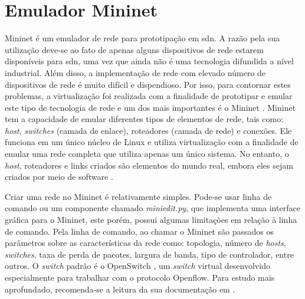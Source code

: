 \section{Emulador Mininet}
\label{sec:mininet}

Mininet \cite{Handigol:2012} é um emulador de rede para prototipação em \gls{sdn}. A razão pela sua utilização deve-se ao fato de apenas alguns dispositivos de rede estarem disponíveis para \gls{sdn}, uma vez que ainda não é uma tecnologia difundida a nível industrial.  Além disso, a implementação de rede com elevado número de dispositivos de rede é muito difícil e dispendioso. Por isso, para contornar estes problemas, a virtualização foi realizada com a finalidade de prototipar e emular este tipo de tecnologia de rede e um dos mais importantes é o Mininet \cite{Wendong:2012}.  Mininet tem a capacidade de emular diferentes tipos de elementos de rede, tais como: \textit{host}, \textit{switches} (camada de enlace), roteadores (camada de rede) e conexões. Ele funciona em um único núcleo de Linux\cite{Negus:2015} e utiliza virtualização com a finalidade de emular uma rede completa que utiliza apenas um único sistema. No entanto, o \textit{host}, roteadores e links criados são elementos do mundo real, embora eles sejam criados por meio de software \cite{website:mininet}.

Criar uma rede no Mininet é relativamente simples. Pode-se usar linha de comando ou um componente chamado \textit{miniedit.py}, que implementa uma interface gráfica para o Mininet, este porém, possui algumas limitações em relação à linha de comando. Pela linha de comando, ao chamar o Mininet são passados os parâmetros sobre as características da rede como: topologia, número de \textit{hosts}, \textit{switches}, taxa de perda de pacotes, largura de banda, tipo de controlador, entre outros. O \textit{switch} padrão é o OpenSwitch \cite{Pettit:2010}, um \textit{switch} virtual desenvolvido especialmente para trabalhar com o protocolo Openflow. Para estudo mais aprofundado, recomenda-se a leitura da sua documentação em \cite{website:mininet}.